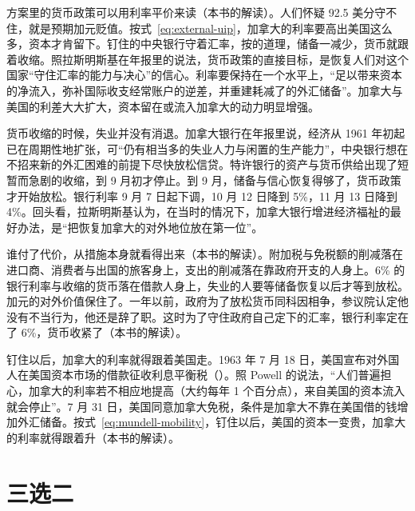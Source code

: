 方案里的货币政策可以用利率平价来读（本书的解读）。人们怀疑 92.5 美分守不住，就是预期加元贬值。按式~\eqref{eq:external-uip}，加拿大的利率要高出美国这么多，资本才肯留下。钉住的中央银行守着汇率，按的道理，储备一减少，货币就跟着收缩。照拉斯明斯基在年报里的说法，货币政策的直接目标，是恢复人们对这个国家“守住汇率的能力与决心”的信心\cite{boc1962}。利率要保持在一个水平上，“足以带来资本的净流入，弥补国际收支经常账户的逆差，并重建耗减了的外汇储备”\cite{boc1962}。加拿大与美国的利差大大扩大，资本留在或流入加拿大的动力明显增强\cite{boc1962}。

货币收缩的时候，失业并没有消退。加拿大银行在年报里说，经济从 1961 年初起已在周期性地扩张，可“仍有相当多的失业人力与闲置的生产能力”，中央银行想在不招来新的外汇困难的前提下尽快放松信贷\cite{boc1962}。特许银行的资产与货币供给出现了短暂而急剧的收缩，到 9 月初才停止\cite{boc1962}。到 9 月，储备与信心恢复得够了，货币政策才开始放松\cite{boc1962}。银行利率 9 月 7 日起下调，10 月 12 日降到 5\%，11 月 13 日降到 4\%\cite{boc1962}。回头看，拉斯明斯基认为，在当时的情况下，加拿大银行增进经济福祉的最好办法，是“把恢复加拿大的对外地位放在第一位”\cite{boc1962}。

谁付了代价，从措施本身就看得出来（本书的解读）。附加税与免税额的削减落在进口商、消费者与出国的旅客身上，支出的削减落在靠政府开支的人身上。6\% 的银行利率与收缩的货币落在借款人身上，失业的人要等储备恢复以后才等到放松。加元的对外价值保住了。一年以前，政府为了放松货币同科因相争，参议院认定他没有不当行为，他还是辞了职。这时为了守住政府自己定下的汇率，银行利率定在了 6\%，货币收紧了（本书的解读）。

钉住以后，加拿大的利率就得跟着美国走。1963 年 7 月 18 日，美国宣布对外国人在美国资本市场的借款征收利息平衡税（）\cite{powell2005}。照 Powell 的说法，“人们普遍担心，加拿大的利率若不相应地提高（大约每年 1 个百分点），来自美国的资本流入就会停止”\cite{powell2005}。7 月 31 日，美国同意加拿大免税，条件是加拿大不靠在美国借的钱增加外汇储备\cite{powell2005}。按式~\eqref{eq:mundell-mobility}，钉住以后，美国的资本一变贵，加拿大的利率就得跟着升（本书的解读）。

\section{三选二}\label{sec:mundell-trilemma}

